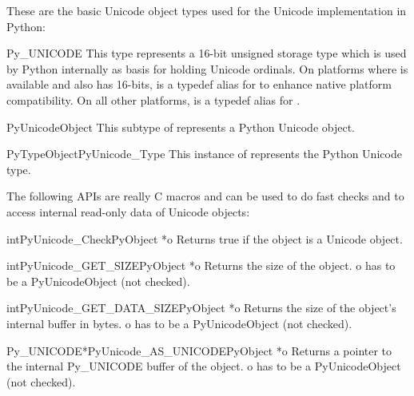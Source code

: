 \documentclass{manual}
\begin{document}

These are the basic Unicode object types used for the Unicode
implementation in Python:

\begin{ctypedesc}{Py_UNICODE}
This type represents a 16-bit unsigned storage type which is used by
Python internally as basis for holding Unicode ordinals. On platforms
where  is available and also has 16-bits,
 is a typedef alias for  to enhance
native platform compatibility. On all other platforms,
 is a typedef alias for .
\end{ctypedesc}

\begin{ctypedesc}{PyUnicodeObject}
This subtype of  represents a Python Unicode object.
\end{ctypedesc}

\begin{cvardesc}{PyTypeObject}{PyUnicode_Type}
This instance of  represents the Python Unicode type.
\end{cvardesc}


The following APIs are really C macros and can be used to do fast
checks and to access internal read-only data of Unicode objects:

\begin{cfuncdesc}{int}{PyUnicode_Check}{PyObject *o}
Returns true if the object  is a Unicode object.
\end{cfuncdesc}

\begin{cfuncdesc}{int}{PyUnicode_GET_SIZE}{PyObject *o}
Returns the size of the object.  o has to be a
PyUnicodeObject (not checked).
\end{cfuncdesc}

\begin{cfuncdesc}{int}{PyUnicode_GET_DATA_SIZE}{PyObject *o}
Returns the size of the object's internal buffer in bytes. o has to be
a PyUnicodeObject (not checked).
\end{cfuncdesc}

\begin{cfuncdesc}{Py_UNICODE*}{PyUnicode_AS_UNICODE}{PyObject *o}
Returns a pointer to the internal Py_UNICODE buffer of the object. o
has to be a PyUnicodeObject (not checked).
\end{cfuncdesc}
\end{document}
